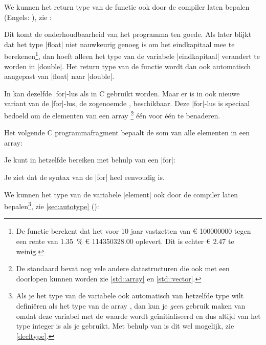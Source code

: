 \begin{cpplstShortInline}
We kunnen het return type van de functie ook door de compiler laten bepalen (Engels: ), zie : 


Dit komt de onderhoudbaarheid van het programma ten goede.
Als later blijkt dat het type |float| niet nauwkeurig genoeg is om het eindkapitaal mee te berekenen\footnote{%
	De functie berekent dat het voor 10 jaar vastzetten van \euro{} \num{100000000} tegen een rente van \SI{1.35}{\percent} \euro{} \num{114350328,00} oplevert.
	Dit is echter \euro{} \num{2.47} te weinig.
}, dan hoeft alleen het type van de variabele |eindkapitaal| verandert te worden in |double|. 
Het return type van de functie wordt dan ook automatisch aangepast van |float| naar |double|.

\label{sec:range-basedfor}
In \Cpp{} kan dezelfde |for|\hyp{}lus als in C gebruikt worden.
Maar er is in \Cpp{} ook nieuwe variant van de |for|\hyp{}lus, de zogenoemde \emph{}, beschikbaar.
Deze |for|\hyp{}lus is speciaal bedoeld om de elementen van een array%
\footnote{%
    De standaard \Cpp{}  bevat nog vele andere datastructuren die ook met een   doorlopen kunnen worden zie \cref{std::array} en \cref{std::vector}.
} één voor één te benaderen.

Het volgende C programmafragment bepaalt de som van alle elementen in een array:


Je kunt in \Cpp hetzelfde bereiken met behulp van een  |for|:


Je ziet dat de syntax van de  |for| heel eenvoudig is.

We kunnen het type van de variabele |element| ook door de compiler laten bepalen\footnote{%
	Als je het type van de variabele  ook automatisch van hetzelfde type wilt definiëren als het type van de array , dan kun je \emph{geen} gebruik maken van  omdat deze variabel met de waarde  wordt geïnitialiseerd en dus altijd van het type integer is als je  gebruikt.
	Met behulp van  is dit wel mogelijk, zie \cref{decltype}.
}, zie \cref{sec:autotype} ():


\end{cpplstShortInline}
